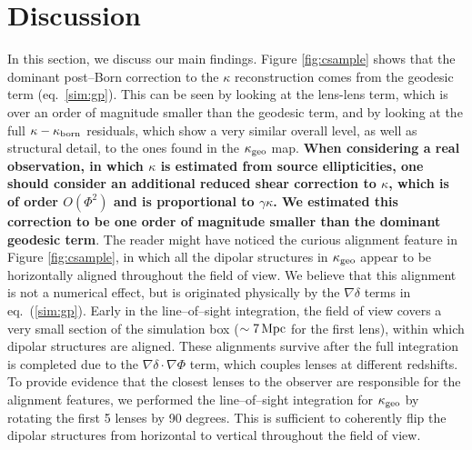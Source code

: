 \documentclass[reprint,aps,prd,superscriptaddress,showkeys,showpacs]{revtex4-1}
\begin{document}
\section{Discussion}
\label{sec:discuss}
% 
In this section, we discuss our main findings. Figure \ref{fig:csample} shows that the dominant post--Born correction to the $\kappa$ reconstruction comes from the geodesic term (eq.~\ref{sim:gp}). This can be seen by looking at the lens-lens term, which is over an order of magnitude smaller than the geodesic term, and by looking at the full $\kappa-\kappa_{\rm born}$ residuals, which show a very similar overall level, as well as structural detail, to the ones found in the $\kappa_{\rm geo}$ map. \textbf{\color{red} When considering a real observation, in which $\kappa$ is estimated from source ellipticities, one should consider an additional reduced shear correction to $\kappa$, which is of order $O(\Phi^2)$ \citep{HirataKrause} and is proportional to $\gamma\kappa$. We estimated this correction to be one order of magnitude smaller than the dominant geodesic term}. The reader might have noticed the curious alignment feature in Figure \ref{fig:csample}, in which all the dipolar structures in $\kappa_{\rm geo}$ appear to be horizontally aligned throughout the field of view. We believe that this alignment is not a numerical effect, but is originated physically by the $\nabla\delta$ terms in eq.~(\ref{sim:gp}). Early in the line--of--sight integration, the field of view covers a very small section of the simulation box ($\sim7\,{\rm Mpc}$ for the first lens), within which dipolar structures are aligned. These alignments survive after the full integration is completed due to the $\nabla\delta\cdot\nabla\Phi$ term, which couples lenses at different redshifts. To provide evidence that the closest lenses to the observer are responsible for the alignment features, we performed the line--of--sight integration for $\kappa_{\rm geo}$ by rotating the first 5 lenses by 90 degrees. This is sufficient to coherently flip the dipolar structures from horizontal to vertical throughout the field of view.
\end{document}
